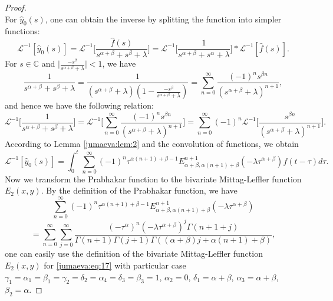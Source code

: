 \documentclass{amsart}
\numberwithin{equation}{section}
\begin{document}
\begin{proof}
\begin{equation}
 \end{equation}
For $\hat{y}_0(s)$, one can obtain the inverse by splitting the function
into simpler functions:
\begin{equation*}
\mathcal{L}^{-1}[\hat{y}_0(s)]=\mathcal{L}^{-1}\bigg[\frac{\hat{f}(s)}{s^{\alpha+\beta}+s^\beta+\lambda}\bigg]=\mathcal{L}^{-1}\bigg[\frac{1}{s^{\alpha+\beta}+s^\alpha+\lambda}\bigg]*\mathcal{L}^{-1}[\hat{f}(s)].
\end{equation*}
For $s\in\mathbb{C}$ and $\bigg|\frac{-s^\beta}{s^{\alpha+\beta}+\lambda}\bigg|<1$, we have 
\begin{equation}
\frac{1}{s^{\alpha+\beta}+s^\beta+\lambda}=\frac{1}{(s^{\alpha+\beta}+\lambda)(1-\frac{-s^\beta}{s^{\alpha+\beta}+\lambda})}=\sum_{n=0}^\infty\frac{(-1)^n s^{\beta n}}{(s^{\alpha+\beta}+\lambda)^{n+1}},\label{jumaeva:eq:16}
\end{equation}
and hence we have the following relation:
\begin{equation*}
\mathcal{L}^{-1}\bigg[\frac{1}{s^{\alpha+\beta}+s^\beta+\lambda}\bigg]=\mathcal{L}^{-1}\bigg[\sum_{n=0}^\infty\frac{(-1)^n s^{\beta n}}{(s^{\alpha+\beta}+\lambda)^{n+1}}\bigg]=\sum_{n=0}^\infty (-1)^n \mathcal{L}^{-1}\bigg[\frac{ s^{\beta n}}{(s^{\alpha+\beta}+\lambda)^{n+1}}\bigg].
\end{equation*}
 According to Lemma \ref{jumaeva:lem:2}  and the convolution of functions, we obtain 
 \begin{equation*}
 \mathcal{L}^{-1}[\hat{y}_0(s)]=\int_0^t\sum_{n=0}^\infty (-1)^n \tau^{\alpha(n+1)+\beta-1}E_{\alpha+\beta,\alpha(n+1)+\beta}^{n+1}(-\lambda\tau^{\alpha+\beta})f(t-\tau)d\tau.
 \end{equation*}
 Now we transform the Prabhakar function to the bivariate Mittag-Leffler function $E_2(x,y)$. By the definition of the Prabhakar function, we have
 \begin{equation*}
 \sum_{n=0}^\infty (-1)^n \tau^{\alpha(n+1)+\beta-1}E_{\alpha+\beta,\alpha(n+1)+\beta}^{n+1}(-\lambda\tau^{\alpha+\beta})
 \end{equation*}
\begin{equation}
 =\sum_{n=0}^\infty \sum_{j=0}^\infty
\frac{(-\tau^\alpha)^n(-\lambda \tau^{\alpha+\beta})^j \Gamma(n+1+j)}{\Gamma(n+1)\Gamma(j+1)\Gamma((\alpha+\beta)j+\alpha(n+1)+\beta)}, \label{jumaeva:eq:17}
\end{equation}
one can easily use the definition of the bivariate Mittag-Leffler function $E_2(x,y)$  for \eqref{jumaeva:eq:17}  with particular case 
$\gamma_1=\alpha_1=\beta_1=\gamma_2=\delta_2=\alpha_4=\delta_3=\beta_3=1$, $\alpha_2=0$,  
$\delta_1=\alpha+\beta$,  $\alpha_3=\alpha+\beta$,  $\beta_2=\alpha$.


\end{proof}
\end{document}
